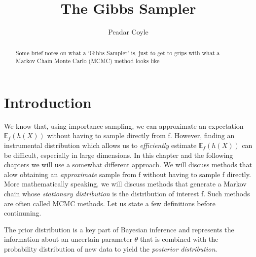 \documentclass[3pd]{elsarticle}
\title{The Gibbs Sampler}
\author{Peadar Coyle}
\newenvironment{definition}[1][Definition]{\begin{trivlist}
\item[\hskip \labelsep {\bfseries #1}]}{\end{trivlist}}
\begin{document}
\maketitle

\begin{abstract}
Some brief notes on what a 'Gibbs Sampler' is, just to get to grips with what a Markov Chain Monte Carlo (MCMC) method
looks like
\end{abstract}

\section{Introduction}
We know that, using importance sampling, we can approximate an expectation $\mathbb{E}_{f}(h(X))$ without
having to sample directly from f. However, finding an instrumental distribution which allows us
to \textit{efficiently} estimate $\mathbb{E}_{f}(h(X))$ can be difficult, especially in large dimensions.
   In this chapter and the following chapters we will use a somewhat different approach. We will discuss
 methods that alow obtaining an \textit{approximate} sample from f without having to sample f directly. More
 mathematically speaking, we will discuss methods that generate a Markov chain whose \textit{stationary distribution}
 is the
 distribution of interest f. Such methods are often called MCMC methods. 
     Let us state a few definitions before continuning.
   \begin{definition}
The prior distribution is a key part of Bayesian inference and represents the information about an uncertain
parameter $\theta$ that is combined with the probability distribution of new data to yield the \textit{posterior 
distribution}.
   \end{definition}
\end{document}
